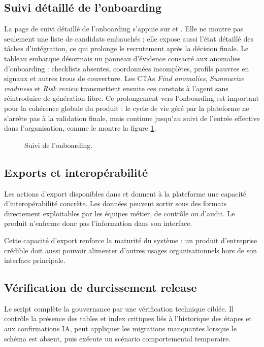 \subsection{Suivi détaillé de l'onboarding}
La page de suivi détaillé de l'onboarding s'appuie sur  et . Elle ne montre pas seulement une liste de candidats embauchés ; elle expose aussi l'état détaillé des tâches d'intégration, ce qui prolonge le recrutement après la décision finale.
Le tableau embarque désormais un panneau d'évidence consacré aux anomalies d'onboarding : checklists absentes, coordonnées incomplètes, profils pauvres en signaux et autres trous de couverture. Les CTAs \textit{Find anomalies}, \textit{Summarize readiness} et \textit{Risk review} transmettent ensuite ces constats à l'agent sans réintroduire de génération libre.
Ce prolongement vers l'onboarding est important pour la cohérence globale du produit : le cycle de vie géré par la plateforme ne s'arrête pas à la validation finale, mais continue jusqu'au suivi de l'entrée effective dans l'organisation, comme le montre la figure \ref{fig:admin-onboarding}.

\begin{figure}[H]
  \centering
  \caption{\label{fig:admin-onboarding}Suivi de l'onboarding.}
\end{figure}

\subsection{Exports et interopérabilité}
Les actions d'export disponibles dans  et  donnent à la plateforme une capacité d'interopérabilité concrète. Les données peuvent sortir sous des formats directement exploitables par les équipes métier, de contrôle ou d'audit. Le produit n'enferme donc pas l'information dans son interface.

Cette capacité d'export renforce la maturité du système : un produit d'entreprise crédible doit aussi pouvoir alimenter d'autres usages organisationnels hors de son interface principale.

\subsection{Vérification de durcissement release}
Le script  complète la gouvernance par une vérification technique ciblée. Il contrôle la présence des tables et index critiques liés à l'historique des étapes et aux confirmations IA, peut appliquer les migrations manquantes lorsque le schéma est absent, puis exécute un scénario comportemental temporaire.

